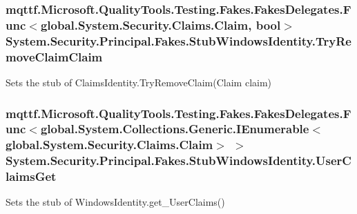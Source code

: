 \hypertarget{class_system_1_1_security_1_1_principal_1_1_fakes_1_1_stub_windows_identity_a5b7f01699468920752d42fa97cad223b}{
\subsubsection[{Try\-Remove\-Claim\-Claim}]{\setlength{\rightskip}{0pt plus 5cm}mqttf.\-Microsoft.\-Quality\-Tools.\-Testing.\-Fakes.\-Fakes\-Delegates.\-Func$<$global.\-System.\-Security.\-Claims.\-Claim, bool$>$ System.\-Security.\-Principal.\-Fakes.\-Stub\-Windows\-Identity.\-Try\-Remove\-Claim\-Claim}}\label{class_system_1_1_security_1_1_principal_1_1_fakes_1_1_stub_windows_identity_a5b7f01699468920752d42fa97cad223b}


Sets the stub of Claims\-Identity.\-Try\-Remove\-Claim(\-Claim claim)

\hypertarget{class_system_1_1_security_1_1_principal_1_1_fakes_1_1_stub_windows_identity_aad649b991830c6363213b11d73c23d8a}{
\subsubsection[{User\-Claims\-Get}]{\setlength{\rightskip}{0pt plus 5cm}mqttf.\-Microsoft.\-Quality\-Tools.\-Testing.\-Fakes.\-Fakes\-Delegates.\-Func$<$global.\-System.\-Collections.\-Generic.\-I\-Enumerable$<$global.\-System.\-Security.\-Claims.\-Claim$>$ $>$ System.\-Security.\-Principal.\-Fakes.\-Stub\-Windows\-Identity.\-User\-Claims\-Get}}\label{class_system_1_1_security_1_1_principal_1_1_fakes_1_1_stub_windows_identity_aad649b991830c6363213b11d73c23d8a}


Sets the stub of Windows\-Identity.\-get\-\_\-\-User\-Claims()



